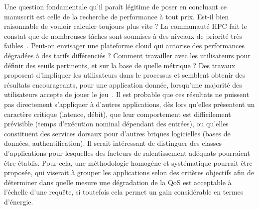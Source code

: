 Une question fondamentale qu'il paraît légitime de poser en concluant ce manuscrit est celle de la recherche de performance à tout prix. Est-il bien raisonnable de vouloir calculer toujours plus vite ? La communauté \gls{HPC} fait le constat que de nombreuses tâches sont soumises à des niveaux de priorité très faibles~\cite{tirmaziBorgNextGeneration2020}. Peut-on envisager une plateforme cloud qui autorise des performances dégradées à des tarifs différenciés ? Comment travailler avec les utilisateurs pour définir des seuils pertinents, et sur la base de quelle métrique ? Des travaux proposent d'impliquer les utilisateurs dans le processus et semblent obtenir des résultats encourageants, pour une application donnée, lorsqu'une majorité des utilisateurs accepte de jouer le jeu~\cite{mokhtariDigitalSustainabilityInvolving}. Il est probable que ces résultats ne puissent pas directement s'appliquer à d'autres applications, dès lors qu'elles présentent un caractère critique (latence, débit), que leur comportement est difficilement prévisible (temps d'exécution nominal dépendant des entrées), ou qu'elles constituent des services dorsaux pour d'autres briques logicielles (bases de données, authentification). Il serait intéressant de distinguer des classes d'applications pour lesquelles des facteurs de ralentissement adéquats pourraient être établis. Pour cela, une méthodologie homogène et systématique pourrait être proposée, qui viserait à grouper les applications selon des critères objectifs afin de déterminer dans quelle mesure une dégradation de la \gls{QoS} est acceptable à l'échelle d'une requête, si toutefois cela permet un gain considérable en termes d'énergie.
